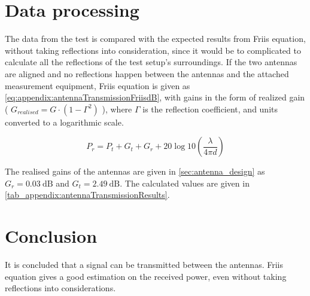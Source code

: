 \section*{Data processing}
The data from the test is compared with the expected results from Friis equation, without taking reflections into consideration, since it would be to complicated to calculate all the reflections of the test setup's surroundings.
If the two antennas are aligned and no reflections happen between the antennas and the attached measurement equipment, Friis equation \citep{AntennaTheoryBook} is given as \autoref{eq:appendix:antennaTransmissionFriisdB}, with gains in the form of realized gain ( $G_{realised} = G \cdot (1-\Gamma^2)$ ), where $\Gamma$ is the reflection coefficient, and units converted to a logarithmic scale. 

\begin{equation} \label{eq:appendix:antennaTransmissionFriisdB}
P_r = P_t + G_t + G_r + 20\log10\left(\frac{\lambda}{4\pi d}\right)
\end{equation}
\startexplain
{}
\stopexplain

The realised gains of the antennas are given in \autoref{sec:antenna_design} as $G_r = \SI{0.03}{\deci\bel}$ and $G_t = \SI{2.49}{\deci\bel}$.
The calculated values are given in \autoref{tab_appendix:antennaTransmissionResults}.

\section*{Conclusion}
It is concluded  that a signal can be transmitted between the antennas. Friis equation gives a good estimation on the received power, even without taking reflections into considerations.





